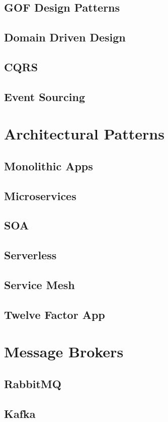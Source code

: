 \documentclass[a4paper]{article}
\begin{document}
    \subsection{GOF Design Patterns}
    \subsection{Domain Driven Design}
    \subsection{CQRS}
    \subsection{Event Sourcing}

    \newpage
    \section{Architectural Patterns}
    \subsection{Monolithic Apps}
    \subsection{Microservices}
    \subsection{SOA}
    \subsection{Serverless}
    \subsection{Service Mesh}
    \subsection{Twelve Factor App}

    \newpage
    \section{Message Brokers}
    \subsection{RabbitMQ}
    \subsection{Kafka}
\end{document}
